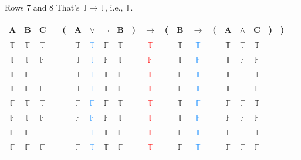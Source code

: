 \documentclass[
  ignorenonframetext,
]{beamer}
\renewcommand{\,}{\text{, }}
\def\True{\mathbb{T}}
\def\False{\mathbb{F}}
\begin{document}
\begin{frame}{Rows 7 and 8}
\protect\hypertarget{rows-7-and-8-1}{}
That's \(\True \rightarrow \True\), i.e., \(\True\).

\begin{center}

\begin{tabular}{@{ }c@{ }@{ }c@{ }@{ }c | c@{ }@{}c@{}@{ }c@{ }@{ }c@{ }@{ }c@{ }@{ }c@{ }@{}c@{}@{ }c@{ }@{}c@{}@{ }c@{ }@{ }c@{ }@{}c@{}@{ }c@{ }@{ }c@{ }@{ }c@{ }@{}c@{}@{}c@{}@{ }c}
A & B & C &  & ( & A & $\vee$ & $\neg$ & B & ) & $\rightarrow$ & ( & B & $\rightarrow$ & ( & A & $\wedge$ & C & ) & ) & \\
\hline 
 $\True$ & $\True$ & $\True$ &  &  & $\True$ & \textcolor{dodgerblue}{$\True$} & $\False$ & $\True$ &  &\textcolor{red}{$\True$}&  & $\True$ & \textcolor{dodgerblue}{$\True$} &  & $\True$ & $\True$ & $\True$ &  &  & \\
 $\True$ & $\True$ & $\False$ &  &  & $\True$ & \textcolor{dodgerblue}{$\True$} & $\False$ & $\True$ &  &\textcolor{red}{$\False$}&  & $\True$ & \textcolor{dodgerblue}{$\False$} &  & $\True$ & $\False$ & $\False$ &  &  & \\
 $\True$ & $\False$ & $\True$ &  &  & $\True$ & \textcolor{dodgerblue}{$\True$} & $\True$ & $\False$ &  &\textcolor{red}{$\True$}&  & $\False$ & \textcolor{dodgerblue}{$\True$} &  & $\True$ & $\True$ & $\True$ &  &  & \\
 $\True$ & $\False$ & $\False$ &  &  & $\True$ & \textcolor{dodgerblue}{$\True$} & $\True$ & $\False$ &  &\textcolor{red}{$\True$}&  & $\False$ & \textcolor{dodgerblue}{$\True$} &  & $\True$ & $\False$ & $\False$ &  &  & \\
 $\False$ & $\True$ & $\True$ &  &  & $\False$ & \textcolor{dodgerblue}{$\False$} & $\False$ & $\True$ &  &\textcolor{red}{$\True$}&  & $\True$ & \textcolor{dodgerblue}{$\False$} &  & $\False$ & $\False$ & $\True$ &  &  & \\
 $\False$ & $\True$ & $\False$ &  &  & $\False$ & \textcolor{dodgerblue}{$\False$} & $\False$ & $\True$ &  &\textcolor{red}{$\True$}&  & $\True$ & \textcolor{dodgerblue}{$\False$} &  & $\False$ & $\False$ & $\False$ &  &  & \\
 $\False$ & $\False$ & $\True$ &  &  & $\False$ & \textcolor{dodgerblue}{$\True$} & $\True$ & $\False$ &  &\textcolor{red}{$\True$}&  & $\False$ & \textcolor{dodgerblue}{$\True$} &  & $\False$ & $\False$ & $\True$ &  &  & \\
 $\False$ & $\False$ & $\False$ &  &  & $\False$ & \textcolor{dodgerblue}{$\True$} & $\True$ & $\False$ &  &\textcolor{red}{$\True$}&  & $\False$ & \textcolor{dodgerblue}{$\True$} &  & $\False$ & $\False$ & $\False$ &  &  & \\
\end{tabular}

\end{center}
\end{frame}
\end{document}
